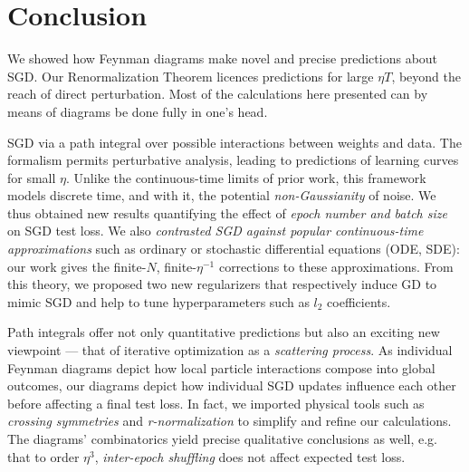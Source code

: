 \documentclass{article}
\begin{document}
\section{Conclusion}


    We showed how Feynman diagrams make novel and precise predictions about
    SGD.  Our Renormalization Theorem licences predictions for large $\eta T$,
    beyond the reach of direct perturbation.  Most of the calculations here
    presented can by means of diagrams be done fully in one's head.


        SGD via a path integral over possible interactions between weights and
        data.  The formalism permits perturbative analysis, leading to
        predictions of learning curves for small $\eta$.  Unlike the
        continuous-time limits of prior work, this framework models discrete
        time, and with it, the potential \emph{non-Gaussianity} of noise.  We
        thus obtained new results quantifying the effect of \emph{epoch number
        and batch size} on SGD test loss.  We also \emph{contrasted SGD against
        popular continuous-time approximations} such as ordinary or stochastic
        differential equations (ODE, SDE): our work gives the finite-$N$,
        finite-$\eta^{-1}$ corrections to these approximations.  From this
        theory, we proposed two new regularizers that respectively induce GD to
        mimic SGD and help to tune hyperparameters such as $l_2$ coefficients.


        Path integrals offer not only quantitative predictions but also an
        exciting new viewpoint --- that of iterative optimization as a
        \emph{scattering process}.  As individual Feynman diagrams \citep{fe49}
        depict how local particle interactions compose into global outcomes,
        our diagrams depict how individual SGD updates influence each other
        before affecting a final test loss.  In fact, we imported physical
        tools such as \emph{crossing symmetries} \citep{dy49b} and
        \emph{r-normalization} \citep{ge54} to simplify and refine our
        calculations.  The diagrams' combinatorics yield precise qualitative
        conclusions as well, e.g. that to order $\eta^3$, \emph{inter-epoch
        shuffling} does not affect expected test loss.
\end{document}
